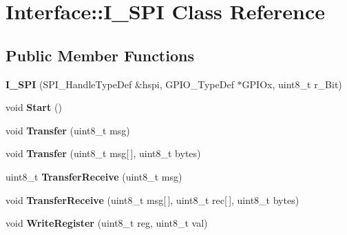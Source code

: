 \hypertarget{classInterface_1_1I__SPI}{}\section{Interface\+::I\+\_\+\+S\+PI Class Reference}
\label{classInterface_1_1I__SPI}
\subsection*{Public Member Functions}
\begin{DoxyCompactItemize}
\item 
\mbox{\label{classInterface_1_1I__SPI_ab925fd980267faf9d2c96d24e4f0d5bd}} 
{\bfseries I\+\_\+\+S\+PI} (S\+P\+I\+\_\+\+Handle\+Type\+Def \&hspi, G\+P\+I\+O\+\_\+\+Type\+Def $\ast$G\+P\+I\+Ox, uint8\+\_\+t r\+\_\+\+Bit)
\item 
\mbox{\label{classInterface_1_1I__SPI_a876689bfd573068d6e44ce24e3672b35}} 
void {\bfseries Start} ()
\item 
\mbox{\label{classInterface_1_1I__SPI_af345850e3e9d67d1f5bddfc6cc755c32}} 
void {\bfseries Transfer} (uint8\+\_\+t msg)
\item 
\mbox{\label{classInterface_1_1I__SPI_a6d800ecd87b0ac920f5c650c8ddbad30}} 
void {\bfseries Transfer} (uint8\+\_\+t msg\mbox{[}$\,$\mbox{]}, uint8\+\_\+t bytes)
\item 
\mbox{\label{classInterface_1_1I__SPI_ab94e196b8b8a7de032d0a8cbe34590b9}} 
uint8\+\_\+t {\bfseries Transfer\+Receive} (uint8\+\_\+t msg)
\item 
\mbox{\label{classInterface_1_1I__SPI_a2a5d262b609429383ad0125174f91cd8}} 
void {\bfseries Transfer\+Receive} (uint8\+\_\+t msg\mbox{[}$\,$\mbox{]}, uint8\+\_\+t rec\mbox{[}$\,$\mbox{]}, uint8\+\_\+t bytes)
\item 
\mbox{\label{classInterface_1_1I__SPI_af293dff982a82316809ad09732557540}} 
void {\bfseries Write\+Register} (uint8\+\_\+t reg, uint8\+\_\+t val)
\item 
\mbox{\label{classInterface_1_1I__SPI_ae265b1d2ba8bda18174b670ae30c9d4e}} 

\end{DoxyCompactItemize}
